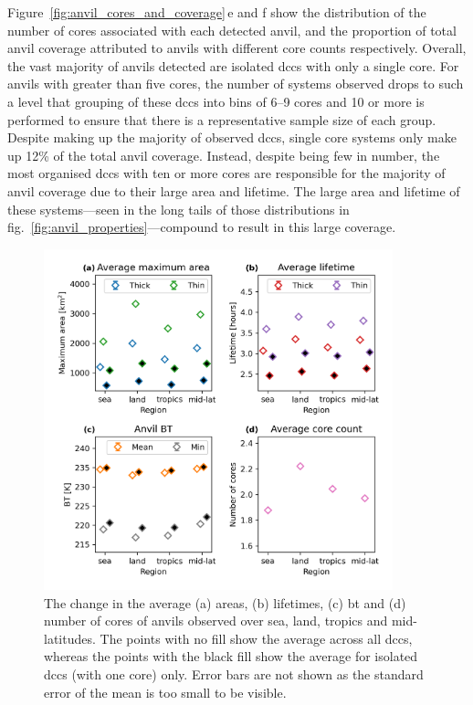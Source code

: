 Figure~\ref{fig:anvil_cores_and_coverage}\,e and f show the distribution of the number of cores associated with each detected anvil, and the proportion of total anvil coverage attributed to anvils with different core counts respectively.
Overall, the vast majority of anvils detected are isolated \acrshort{dcc}s with only a single core.
For anvils with greater than five cores, the number of systems observed drops to such a level that grouping of these \acrshort{dcc}s into bins of 6--9 cores and 10 or more is performed to ensure that there is a representative sample size of each group.
Despite making up the majority of observed \acrshort{dcc}s, single core systems only make up 12\% of the total anvil coverage.
Instead, despite being few in number, the most organised \acrshort{dcc}s with ten or more cores are responsible for the majority of anvil coverage due to their large area and lifetime.
The large area and lifetime of these systems---seen in the long tails of those distributions in fig.~\ref{fig:anvil_properties}---compound to result in this large coverage.

\begin{figure}[tp]
    \centering
    \includegraphics[width=0.9\textwidth]{figures/chapter2_22.png}
    \caption[
    The change in the average areas, lifetimes, \acrshort{bt} and number of cores of anvils observed over sea, land, tropics and mid-latitudes.
    ]{
    The change in the average (a) areas, (b) lifetimes, (c) \acrshort{bt} and (d) number of cores of anvils observed over sea, land, tropics and mid-latitudes. The points with no fill show the average across all \acrshort{dcc}s, whereas the points with the black fill show the average for isolated \acrshort{dcc}s (with one core) only. Error bars are not shown as the standard error of the mean is too small to be visible.
    }
    \label{fig:anvil_properties_regions}
\end{figure}

